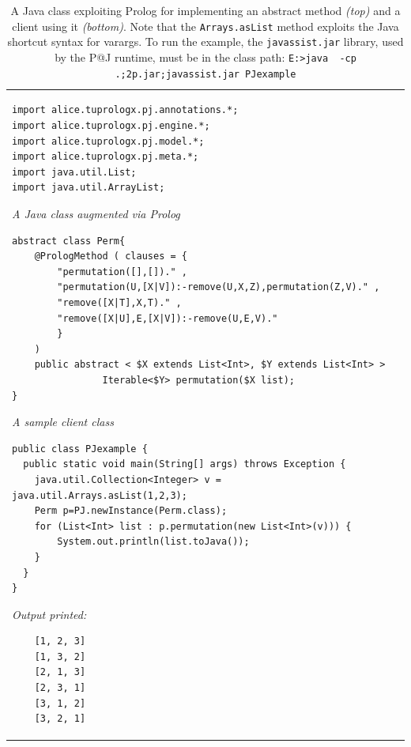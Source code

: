 \begin{table}
{\footnotesize
\begin{tabular}[-1cm]{p{12cm}}
\begin{verbatim}
import alice.tuprologx.pj.annotations.*;
import alice.tuprologx.pj.engine.*;
import alice.tuprologx.pj.model.*;
import alice.tuprologx.pj.meta.*;
import java.util.List;
import java.util.ArrayList;
\end{verbatim}
\textsf{\emph{A Java class augmented via Prolog}}
\begin{verbatim}
abstract class Perm{
    @PrologMethod ( clauses = {
        "permutation([],[])." ,
        "permutation(U,[X|V]):-remove(U,X,Z),permutation(Z,V)." ,
        "remove([X|T],X,T)." ,
        "remove([X|U],E,[X|V]):-remove(U,E,V)."
        }
    )
    public abstract < $X extends List<Int>, $Y extends List<Int> >
                Iterable<$Y> permutation($X list);
}
\end{verbatim}
\textsf{\emph{A sample client class}}
\begin{verbatim}
public class PJexample {
  public static void main(String[] args) throws Exception {
    java.util.Collection<Integer> v = java.util.Arrays.asList(1,2,3);
    Perm p=PJ.newInstance(Perm.class);
    for (List<Int> list : p.permutation(new List<Int>(v))) {
        System.out.println(list.toJava());
    }
  }
}
\end{verbatim}
\textsf{\emph{Output printed:}}
\begin{verbatim}
    [1, 2, 3]
    [1, 3, 2]
    [2, 1, 3]
    [2, 3, 1]
    [3, 1, 2]
    [3, 2, 1]
\end{verbatim}
\end{tabular}
}\caption{A Java class exploiting Prolog for implementing an abstract method \textit{(top)} and a client using it \textit{(bottom)}. Note that the \texttt{Arrays.asList} method exploits the Java shortcut syntax for varargs.
To run the example, the \texttt{javassist.jar} library, used by the P@J runtime, must be in the class path: \texttt{E:>java~~-cp .;2p.jar;javassist.jar PJexample}
}
\label{tab:pj-example1}
\end{table}


